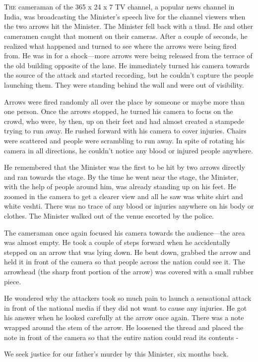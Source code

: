 \chapter{}

\lettrine{T}{he} cameraman of the 365 x 24 x 7 TV channel, a popular news channel in India,
was broadcasting the Minister's speech live for the channel viewers when the two
arrows hit the Minister. The Minister fell back with a thud. He and other
cameramen caught that moment on their cameras. After a couple of seconds, he
realized what happened and turned to see where the arrows were being fired from.
He was in for a shock—more arrows were being released from the terrace of the
old building opposite of the lane. He immediately turned his camera towards the
source of the attack and started recording, but he couldn't capture the people
launching them. They were standing behind the wall and were out of visibility.

Arrows were fired randomly all over the place by someone or maybe more than one
person. Once the arrows stopped, he turned his camera to focus on the crowd, who
were, by then, up on their feet and had almost created a stampede trying to run
away. He rushed forward with his camera to cover injuries. Chairs were scattered
and people were scrambling to run away. In spite of rotating his camera in all
directions, he couldn't notice any blood or injured people anywhere.

He remembered that the Minister was the first to be hit by two arrows directly
and ran towards the stage. By the time he went near the stage, the Minister,
with the help of people around him, was already standing up on his feet. He
zoomed in the camera to get a clearer view and all he saw was white shirt and
white veshti. There was no trace of any blood or injuries anywhere on his body
or clothes. The Minister walked out of the venue escorted by the police.

The cameraman once again focused his camera towards the audience—the area was
almost empty. He took a couple of steps forward when he accidentally stepped on
an arrow that was lying down. He bent down, grabbed the arrow and held it in
front of the camera so that people across the nation could see it. The arrowhead
(the sharp front portion of the arrow) was covered with a small rubber piece.

He wondered why the attackers took so much pain to launch a sensational attack
in front of the national media if they did not want to cause any injuries. He
got his answer when he looked carefully at the arrow once again. There was a
note wrapped around the stem of the arrow. He loosened the thread and placed the
note in front of the camera so that the entire nation could read its contents -

We seek justice for our father's murder by this Minister, six months back.